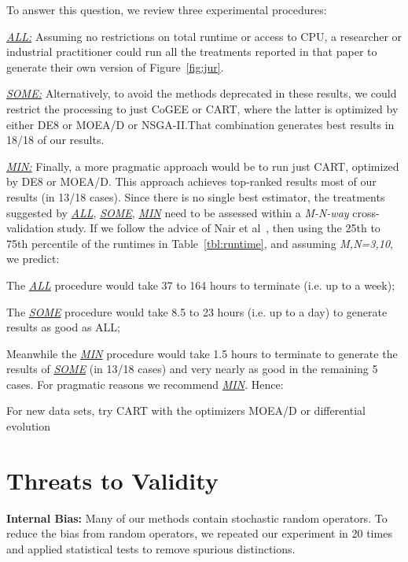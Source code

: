 To answer this question, we review
 three experimental procedures:
\be
\item
\underline{{\em ALL:}} Assuming no restrictions on total runtime or access to   CPU, a researcher
or industrial practitioner could run all the treatments reported in that paper
to generate their own version of Figure~\ref{fig:jur}. 
\item
\underline{{\em SOME:}} Alternatively, to avoid the methods deprecated in these results,
we could restrict the
processing  to just  CoGEE or  CART, where the latter is optimized by either DE8 or MOEA/D or NSGA-II.That combination generates best results in 18/18 of our results.
\item \underline{{\em MIN:}} 
Finally, a more pragmatic approach would be to run just CART, optimized by DE8 or MOEA/D. This approach achieves top-ranked results most of our results
(in 13/18 cases). 
\ee
Since there is no single best estimator, the  treatments suggested by 
\underline{{\em ALL}}, \underline{{\em SOME}}, \underline{{\em MIN}}
need to be assessed within a {\em M-N-way} cross-validation study.
If we follow the advice of Nair et al~\cite{nair18}, then
using the 25th to 75th percentile of the runtimes in   Table~\ref{tbl:runtime}, 
and assuming {\em M,N=3,10}, we predict:
\bi
\item
The \underline{{\em ALL}} procedure would take 37 to   164 hours to terminate (i.e. up to a week);
\item
The \underline{{\em SOME}} procedure would take 8.5 to 23 hours  (i.e. up to a day)
to  generate results
as good as ALL;
\item
Meanwhile the \underline{{\em MIN}}  procedure would take 1.5 hours to terminate to  generate the results
of  \underline{{\em SOME}}  (in 13/18 cases) and very nearly as good in the remaining 5 cases.
\ei
For pragmatic reasons we recommend \underline{{\em MIN}}.
Hence:
\begin{result}{4}
   For new data sets, try
CART
with the optimizers
MOEA/D
or
differential evolution
 \end{result}



\section{Threats to Validity}\label{sect:threats}
 \textbf{Internal Bias:} Many of  our methods contain stochastic random operators. To reduce the bias from random operators, we 
repeated our experiment in 20 times and applied statistical tests to remove spurious distinctions.

